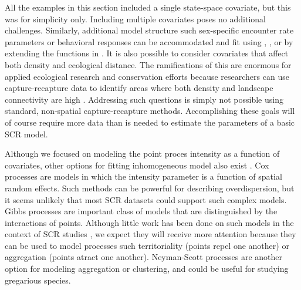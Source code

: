 All the examples in this section included a single state-space
covariate, but this was for simplicity only. Including multiple
covariates poses no additional challenges. Similarly, additional model
structure such sex-specific encounter rate parameters or behavioral
responses can be accommodated and fit using \secr, \bugs, or by
extending the functions in \scrbook. It is also possible to consider
covariates that affect both density and ecological
distance. The ramifications of this are enormous for applied
ecological research and conservation efforts because %
researchers can use capture-recapture data to identify areas where
both density and landscape connectivity are high
\citep{royle_etal:2012ecol}. Addressing such questions
is simply not possible using standard, non-spatial capture-recapture
methods. Accomplishing these goals will of course require more data
than is needed to estimate the parameters of a basic SCR model.





Although we focused on modeling the point proces intensity as a
function of covariates, other options for fitting inhomogeneous model
also exist \citet{illian_etal:2008}. Cox processes are  models in which the
intensity parameter is a function of spatial random effects. Such methods can be
powerful for describing overdispersion, but it seems unlikely that
most SCR datasets could support such complex models. Gibbs processes
are important class of models that are distinguished by the
interactions of points. Although little work has been done on such
models in the context of SCR studies \citep{reich_etal:2012}, we
expect they will receive more
attention because they can be used to model processes such
territoriality (points repel one another) or aggregation (points
atract one another). Neyman-Scott processes are another option for
modeling aggregation or clustering, and could be useful for studying
gregarious species.

